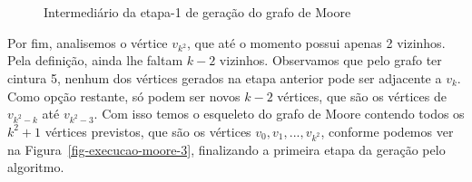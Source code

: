 \begin{figure}[h]
\caption{Intermediário da etapa-1 de geração do grafo de Moore}
\label{fig-execucao-moore-2}
\end{figure}


Por fim, analisemos o vértice $v_{k^2}$, que até o momento possui apenas 2 vizinhos. Pela definição, ainda lhe faltam $k-2$ vizinhos. Observamos que pelo grafo ter cintura 5, nenhum dos vértices gerados na etapa anterior pode ser adjacente a $v_k$. Como opção restante, só podem ser novos $k-2$ vértices, que são os vértices de $v_{k^2-k}$ até $v_{k^2-3}$. Com isso temos o esqueleto do grafo de Moore contendo todos os $k^2+1$ vértices previstos, que são os vértices $v_0,v_1,...,v_{k^2}$, conforme podemos ver na Figura~\ref{fig-execucao-moore-3}, finalizando a primeira etapa da geração pelo algoritmo.

